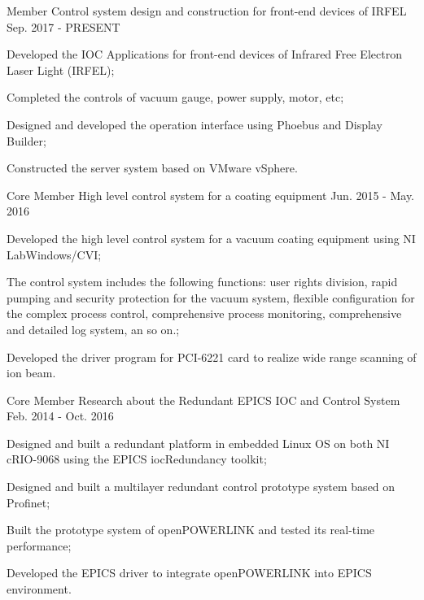 \begin{cventries}
  \cventry
    {Member} %
    {Control system design and construction for front-end devices of IRFEL} %
    {} %
    {Sep. 2017 - PRESENT} %
    {
      \begin{cvitems} %
        \item {Developed the IOC Applications for front-end devices of Infrared Free Electron Laser Light (IRFEL);}
        \item {Completed the controls of vacuum gauge, power supply, motor, etc;}
        \item {Designed and developed the operation interface using Phoebus and Display Builder;}
        \item {Constructed the server system based on VMware vSphere.}
      \end{cvitems}
    }

  \cventry
    {Core Member} %
    {High level control system for a coating equipment} %
    {} %
    {Jun. 2015 - May. 2016} %
    {
      \begin{cvitems} %
        \item {Developed the high level control system for a vacuum coating equipment using NI LabWindows/CVI;}
        \item {The control system includes the following functions: user rights division, rapid pumping and security protection for the vacuum system, flexible configuration for the complex process control, comprehensive process monitoring, comprehensive and detailed log system, an so on.;}
        \item {Developed the driver program for PCI-6221 card to realize wide range scanning of ion beam.}
      \end{cvitems}
    }

  \cventry
    {Core Member} %
    {Research about the Redundant EPICS IOC and Control System} %
    {} %
    {Feb. 2014 - Oct. 2016} %
    {
      \begin{cvitems} %
        \item {Designed and built a redundant platform in embedded Linux OS on both NI cRIO-9068 using the EPICS iocRedundancy toolkit;}
        \item {Designed and built a multilayer redundant control prototype system based on Profinet;}
        \item {Built the prototype system of openPOWERLINK and tested its real-time performance;}
        \item {Developed the EPICS driver to integrate openPOWERLINK into EPICS environment.}
      \end{cvitems}
    }

\end{cventries}
